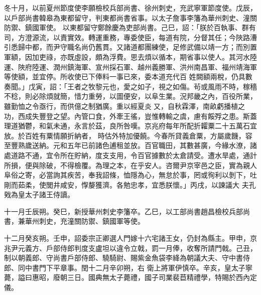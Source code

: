 \begin{pinyinscope}
 冬十月，以前夏州節度使李願檢校兵部尚書、徐州刺史，充武寧軍節度使。戊辰，以戶部尚書韓皋為東都留守，判東都尚書省事。以太子詹事李籓為華州刺史、潼關防禦、鎮國軍使。
 以東都留守鄭餘慶為吏部尚書。己巳，詔：「朕於百執事、群有司，方澄源流，以責實效。轉運重務，專委使臣，每道有院，分督其任；今陜路漕引悉歸中都，而尹守職名尚仍舊貫。又諸道都團練使，足修武備以靖一方；而別置軍額，因加吏祿，亦既虛設，頗為浮費。思去煩以循本，期省事以使人。其河水陸運、陜府陸運、潤州鎮海軍、宣州採石軍、越州義勝軍、洪州南昌軍、福州靖海軍等使額，並宜停。所收使已下俸料一事已來，委本道充代百
 姓闕額兩稅，仍具數奏聞。」戊寅，詔：「王者之牧黎元也，愛之如子，視之如傷。茍或風雨不時，稼穡不稔，則必除煩就簡，惜力重勞，以圖便安，以阜生業。況邦畿之內，百役所業，雖勤恤之令亟行，而供億之制猶廣。重以經夏炎又，自秋霖澤，南畝虧播植之功，西成失豐登之望。內管口食，外牽王徭，豈惟轉輸之虞，慮有餒殍之患。斯蓋理道猶鬱，和氣未通，永言於茲，良所咎嘆。京兆府每年所配折糶粟二十五萬石宜放。於百姓有粟情願折納者，
 時估外特加優饒。今春所貸義倉粟，方屬歲饑，容至豐熟歲送納。元和五年已前諸色逋租並放。百官職田，其數甚廣，今緣水潦，諸處道路不通，宜令所在貯納，度支支用，令百官據數於太倉請受。遭水旱處，通計所損，便與除破，不得檢覆。為理之本，在乎安人。咨爾尹京宰邑之臣，實為親人阜俗之寄，必當詢其疾苦，奉我詔條，恤隱為心，無怠於事，罔或徇利以剝下，吐剛而茹柔，使閭井咸安，惸嫠獲濟。各勉忠孝，宜悉朕懷。」丙戌，以諫議大
 夫孔戣為皇太子諸王侍讀。



 十一月壬辰朔。癸巳，新授華州刺史李籓卒。乙巳，以工部尚書趙昌檢校兵部尚書，兼華州刺史，充潼關防禦、鎮國軍等使。



 十二月癸亥朔。壬申，詔委宗正卿選人門嫁十六宅諸王女，仍封為縣主。甲申，京兆尹元義方、戶部侍郎判度支盧坦以違令立戟，罰一月俸，收奪所請門戟。己丑，制以朝義郎、守尚書戶部侍郎、驍騎尉、賜紫金魚袋李絳為朝議大夫、守中書侍郎、同中書門下平章事。閏十二月辛卯朔，右
 衛上將軍伊慎卒。辛亥，皇太子寧薨，謚曰惠昭，廢朝三日。國典無太子薨禮，國子司業裴苣精禮學，特賜於西內定儀。



\end{pinyinscope}